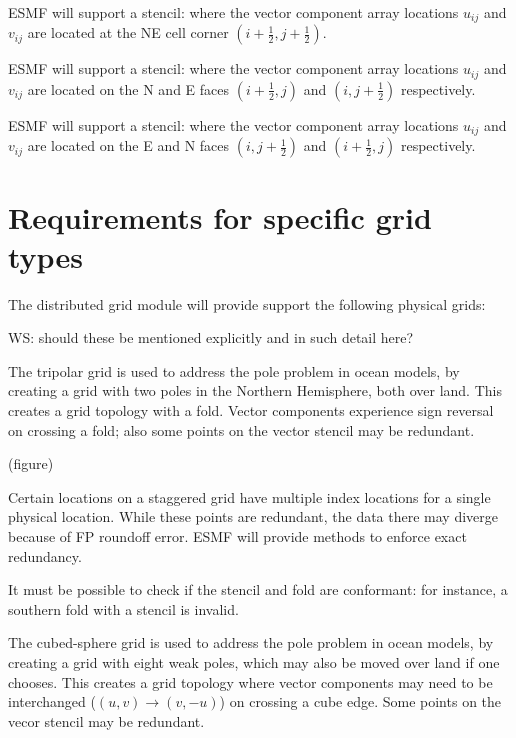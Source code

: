 ESMF will support a \bgrid stencil: where the vector
component array locations $u_{ij}$ and $v_{ij}$ are located at the NE
cell corner $(i+\frac12,j+\frac12)$.

\sreq{\cgrid}

ESMF will support a \cgrid stencil: where the vector
component array locations $u_{ij}$ and $v_{ij}$ are located on the N
and E faces $(i+\frac12,j)$ and $(i,j+\frac12)$ respectively.

\sreq{\dgrid}

ESMF will support a \dgrid stencil: where the vector
component array locations $u_{ij}$ and $v_{ij}$ are located on the E
and N faces $(i,j+\frac12)$ and $(i+\frac12,j)$ respectively.

\part{Requirements for specific grid types} \label{DG:gridtypes}

The distributed grid module will provide support the following 
physical grids:

WS: should these be mentioned explicitly and in such detail here?



The tripolar grid \cite{ref:m1996} is used to address the pole problem
in ocean models, by creating a grid with two poles in the Northern
Hemisphere, both over land. This creates a grid topology with a
fold. Vector components experience sign reversal on crossing a fold;
also some points on the vector stencil may be redundant.

(figure)



Certain locations on a staggered grid have multiple index locations
for a single physical location. While these points are redundant, the
data there may diverge because of FP roundoff error. ESMF will provide
methods to enforce exact redundancy.


It must be possible to check if the stencil and fold are conformant:
for instance, a southern fold with a \bgrid stencil is
invalid.


The cubed-sphere grid \cite{ref:rpm1996} is used to address the pole
problem in ocean models, by creating a grid with eight weak poles,
which may also be moved over land if one chooses. This creates a grid
topology where vector components may need to be interchanged
($(u,v)\longrightarrow(v,-u)$) on crossing a cube edge. Some points on
the vecor stencil may be redundant.

